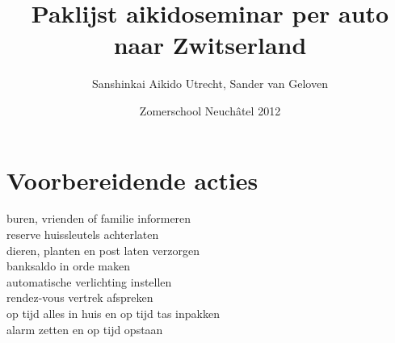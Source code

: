 \documentclass[9pt,twocolumn]{memoir}
\begin{document}
\title{\Huge\bfseries Paklijst aikidoseminar per auto naar Zwitserland}
\author{Sanshinkai Aikido Utrecht, Sander van Geloven}
\date{Zomerschool Neuchâtel 2012}
\maketitle

\section*{Voorbereidende acties}
buren, vrienden of familie informeren\\
reserve huissleutels achterlaten\\
dieren, planten en post laten verzorgen\\
banksaldo in orde maken\\
automatische verlichting instellen\\
rendez-vous vertrek afspreken\\
op tijd alles in huis en op tijd tas inpakken\\
alarm zetten en op tijd opstaan
\end{document}
